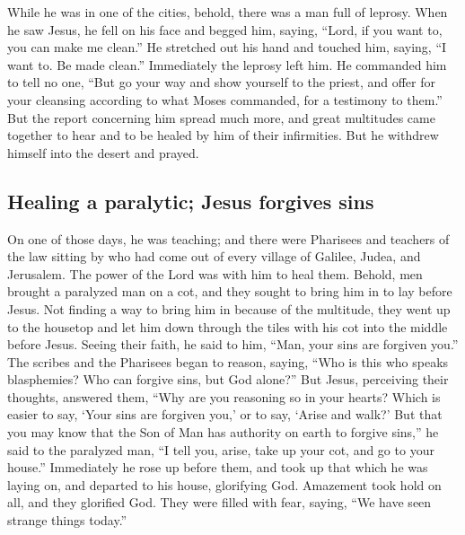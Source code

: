  While he was in one of the cities, behold, there was a
man full of leprosy. When he saw Jesus, he fell on his face and begged
him, saying, ``Lord, if you want to, you can make me clean.''
 He stretched out his hand and touched him, saying, ``I
want to. Be made clean.'' Immediately the leprosy left him.
 He commanded him to tell no one, ``But go your way and
show yourself to the priest, and offer for your cleansing according to
what Moses commanded, for a testimony to them.''  But the
report concerning him spread much more, and great multitudes came
together to hear and to be healed by him of their infirmities.
 But he withdrew himself into the desert and prayed.

\hypertarget{healing-a-paralytic-jesus-forgives-sins}{%
\subsection{Healing a paralytic; Jesus forgives
sins}\label{healing-a-paralytic-jesus-forgives-sins}}

 On one of those days, he was teaching; and there were
Pharisees and teachers of the law sitting by who had come out of every
village of Galilee, Judea, and Jerusalem. The power of the Lord was with
him to heal them.  Behold, men brought a paralyzed man on
a cot, and they sought to bring him in to lay before Jesus.
 Not finding a way to bring him in because of the
multitude, they went up to the housetop and let him down through the
tiles with his cot into the middle before Jesus.  Seeing
their faith, he said to him, ``Man, your sins are forgiven you.''
 The scribes and the Pharisees began to reason, saying,
``Who is this who speaks blasphemies? Who can forgive sins, but God
alone?''  But Jesus, perceiving their thoughts, answered
them, ``Why are you reasoning so in your hearts?  Which
is easier to say, `Your sins are forgiven you,' or to say, `Arise and
walk?'  But that you may know that the Son of Man has
authority on earth to forgive sins,'' he said to the paralyzed man, ``I
tell you, arise, take up your cot, and go to your house.''
 Immediately he rose up before them, and took up that
which he was laying on, and departed to his house, glorifying God.
 Amazement took hold on all, and they glorified God. They
were filled with fear, saying, ``We have seen strange things today.''

